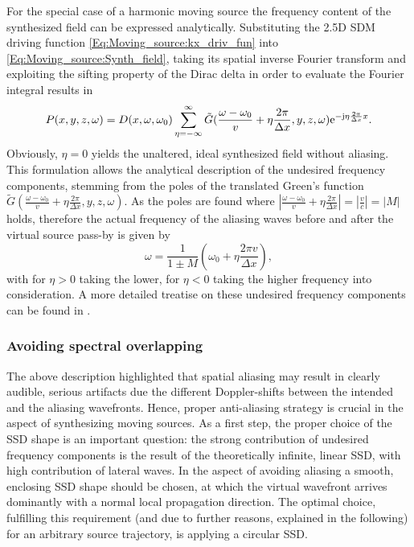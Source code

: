 For the special case of a harmonic moving source the frequency content of the synthesized field can be expressed analytically.
Substituting the 2.5D SDM driving function \eqref{Eq:Moving_source:kx_driv_fun} into \eqref{Eq:Moving_source:Synth_field}, taking its spatial inverse Fourier transform and exploiting the sifting property of the Dirac delta in order to evaluate the Fourier integral results in
\begin{equation}
P(x,y,z,\omega) = 
D(x,\omega,\omega_0)
\sum_{\eta = -\infty}^{\infty}
\tilde{G}( \frac{\omega-\omega_0}{v} +  \eta \frac{2\pi}{\Delta x},y,z, \omega )
 \mathrm{e}^{-\mathrm{j}  \eta \frac{2\pi}{\Delta x}  x}.
\end{equation}
Obviously, $\eta = 0$ yields the unaltered, ideal synthesized field without aliasing.
This formulation allows the analytical description of the undesired frequency components, stemming from the poles of the translated Green's function $\tilde{G}( \frac{\omega-\omega_0}{v} +  \eta \frac{2\pi}{\Delta x},y,z, \omega )$.
As the poles are found where $|\frac{\omega-\omega_0}{v} +  \eta \frac{2\pi}{\Delta x}| = |\frac{v}{c}| = |M|$ holds, therefore the actual frequency of the aliasing waves before and after the virtual source pass-by is given by
\begin{equation}
\omega = \frac{1}{1 \pm M} \left( \omega_0 + \eta \frac{2\pi v}{\Delta x} \right),
\end{equation}
with for $\eta > 0$ taking the lower, for $\eta < 0$ taking the higher frequency into consideration.
A more detailed treatise on these undesired frequency components can be found in \cite{firtha2016:daga}.

\subsubsection{Avoiding spectral overlapping}
The above description highlighted that spatial aliasing may result in clearly audible, serious artifacts due the different Doppler-shifts between the intended and the aliasing wavefronts.
Hence, proper anti-aliasing strategy is crucial in the aspect of synthesizing moving sources.
As a first step, the proper choice of the SSD shape is an important question: the strong contribution of undesired frequency components is the result of the theoretically infinite, linear SSD, with high contribution of lateral waves.
In the aspect of avoiding aliasing a smooth, enclosing SSD shape should be chosen, at which the virtual wavefront arrives dominantly with a normal local propagation direction.
The optimal choice, fulfilling this requirement (and due to further reasons, explained in the following) for an arbitrary source trajectory, is applying a circular SSD.

